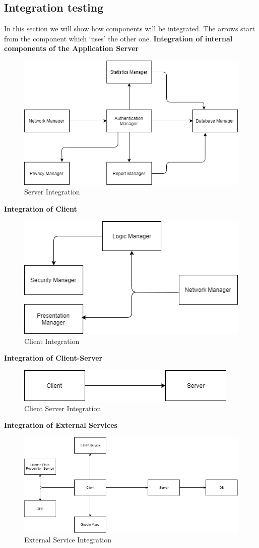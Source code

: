 \documentclass{article}
\begin{document}
\subsection{Integration testing}
In this section we will show how components will be integrated. The arrows start from the component which ‘uses’ the other one.
\textbf{Integration of internal components of the Application Server}
\begin{figure}[H]
    \centering
    \includegraphics[scale=0.5]{img/integration/Server_test.png}
    \caption{Server Integration}
\end{figure}

\textbf{Integration of Client}
\begin{figure}[H]
    \centering
    \includegraphics[scale=0.5]{img/integration/Client_test.png}
    \caption{Client Integration}
\end{figure}

\textbf{Integration of Client-Server}
\begin{figure}[H]
    \centering
    \includegraphics[scale=0.5]{img/integration/ClientServer_test.png}
    \caption{Client Server Integration}
\end{figure}

\textbf{Integration of External Services}
\begin{figure}[H]
    \centering
    \includegraphics[scale=0.4]{img/integration/ExternalService_test.png}
    \caption{External Service Integration}
\end{figure}
\end{document}

